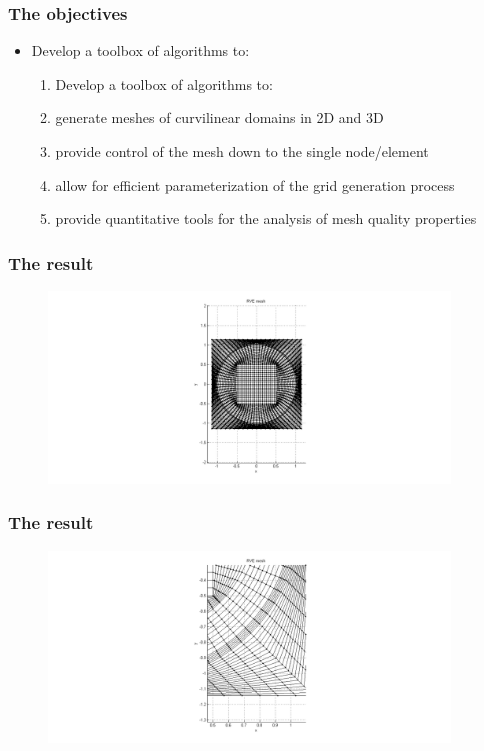 \documentclass[first,firstsupp,lastsupp,handout,last,hyperref,table]{ETHclass}
\begin{document}
\begin{frame}[t]
  \frametitle{The objectives}
  \begin{itemize}
  \justifying
   \item {\scriptsize Develop a toolbox of algorithms to:}
 \begin{enumerate}
  \justifying
   \item {\scriptsize Develop a toolbox of algorithms to:}
\item {\scriptsize generate meshes of curvilinear domains in 2D and 3D}
\item {\scriptsize provide control of the mesh down to the single node/element}
\item {\scriptsize allow for efficient parameterization of the grid generation process}
\item {\scriptsize provide quantitative tools for the analysis of mesh quality properties}
  \end{enumerate}
  \end{itemize}
\end{frame}

\begin{frame}[t]
\frametitle{The result}
\vspace{-0.25cm}
 \centering
 \begin{figure}[!h]
  \includegraphics[width=0.95\textwidth]{mesh_single_order1}
  \end{figure} 
\end{frame}

\begin{frame}[t]
\frametitle{The result}
\vspace{-0.25cm}
 \centering
 \begin{figure}[!h]
  \includegraphics[width=0.95\textwidth]{mesh_single_order1-zoom1}
  \end{figure} 
\end{frame}
\end{document}
